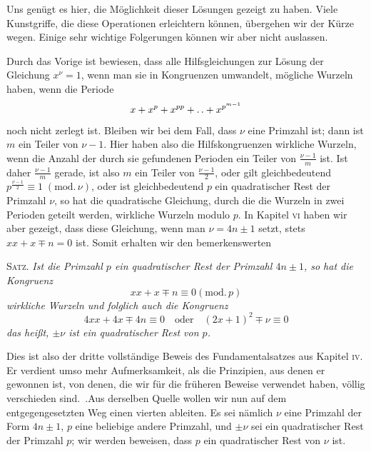 Uns genügt es hier, die Möglichkeit dieser Lösungen gezeigt zu haben. Viele Kunstgriffe, die diese Operationen erleichtern können, übergehen wir der Kürze wegen. Einige sehr wichtige Folgerungen können wir aber nicht auslassen.

Durch das Vorige ist bewiesen, dass alle Hilfsgleichungen zur Lösung der Gleichung $x^\nu=1$, wenn man sie in Kongruenzen umwandelt, mögliche Wurzeln haben, wenn die Periode
\[
x+x^p+x^{pp}+\mathinner{.\,.}+x^{p^{m-1}}
\]
noch nicht zerlegt ist. Bleiben wir bei dem Fall, dass $\nu$ eine Primzahl ist; dann ist $m$ ein Teiler von $\nu-1$. Hier haben also die Hilfskongruenzen wirkliche Wurzeln, wenn die Anzahl der durch sie gefundenen Perioden ein Teiler von $\frac{\nu-1}m$ ist. Ist daher $\frac{\nu-1}m$ gerade, ist also $m$ ein Teiler von $\frac{\nu-1}2$, oder gilt gleichbedeutend $p^{\frac{\nu-1}2}\equiv1\;(\mathrm{mod.}\,\nu)$, oder ist gleichbedeutend $p$ ein quadratischer Rest der Primzahl $\nu$, so hat die quadratische Gleichung, durch die die Wurzeln in zwei Perioden geteilt werden, wirkliche Wurzeln modulo $p$. In Kapitel \textsc{vi} haben wir aber gezeigt, dass diese Gleichung, wenn man $\nu=4n\pm1$ setzt, stets $xx+x\mp n=0$ ist. Somit erhalten wir den bemerkenswerten

\textsc{Satz.} \emph{Ist die Primzahl $p$ ein quadratischer Rest der Primzahl $4n\pm1$, so hat die Kongruenz}
\[
xx+x\mp n\equiv0(\mathrm{mod.}\,p)
\]
\emph{wirkliche Wurzeln und folglich auch die Kongruenz}
\[
4xx+4x\mp4n\equiv0\quad\text{oder}\quad(2x+1)^2\mp\nu\equiv0
\]
\emph{das heißt, $\pm\nu$ ist ein quadratischer Rest von $p$.}

Dies ist also der dritte vollständige Beweis des Fundamentalsatzes aus Kapitel \textsc{iv}. Er verdient umso mehr Aufmerksamkeit, als die Prinzipien, aus denen er gewonnen ist, von denen, die wir für die früheren Beweise verwendet haben, völlig verschieden sind.\ .Aus derselben Quelle wollen wir nun auf dem entgegengesetzten Weg einen vierten ableiten. Es sei nämlich $\nu$ eine Primzahl der Form $4n\pm1$, $p$ eine beliebige andere Primzahl, und $\pm\nu$ sei ein quadratischer Rest der Primzahl $p$; wir werden beweisen, dass $p$ ein quadratischer Rest von $\nu$ ist.

